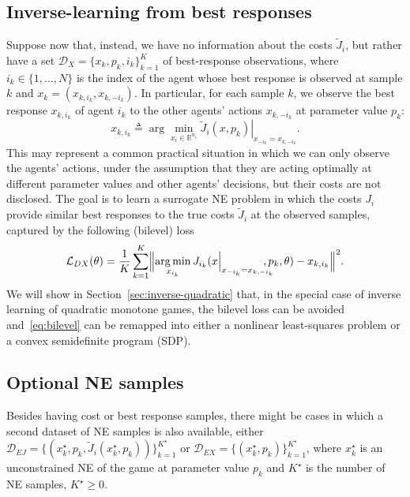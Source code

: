 \documentclass[11pt, a4paper]{article}
\newcommand{\rr}{\mathbb{R}}
\newcommand{\DD}{\mathcal{D}}
\newcommand{\LL}{\mathcal{L}}
\theoremstyle{remark}
\theoremstyle{plain}
\begin{document}
\subsection{Inverse-learning from best responses}
Suppose now that, instead, we have no information about the costs $\tilde J_i$, but rather have a set 
$\DD_X=\{x_k,p_k,i_k\}_{k=1}^{K}$ of best-response observations, where $i_k\in\{1,\ldots,N\}$ is the index of the agent whose best response is observed at sample $k$ and $x_k = (x_{k,i_k}, x_{k,-i_k})$. In particular,
for each sample $k$, we observe the best response $x_{k,i_k}$ of agent $i_k$ to the other agents' actions $x_{k,-i_k}$ at parameter value $p_k$:
\[
    x_{k,i_k} \triangleq \arg\min_{x_i\in\rr^{n_i}} \left. \tilde J_{i}(x,p_k)\right|_{x_{-i_k}=x_{k,-i_k}}.
\]
This may represent a common practical situation in which we can only observe the agents' actions, under the assumption that they are acting optimally at different parameter values and other agents' decisions, but their costs are not disclosed. The goal is to learn a surrogate NE problem in which the costs $J_i$ provide similar best responses to the true costs $\tilde J_i$ at the observed samples, captured by the following (bilevel) loss
\begin{equation}
    \LL_{DX}(\theta) = \frac{1}{K}\sum_{k=1}^{K}
    \Bigl\| \operatorname*{arg\,min}_{x_{i_k}} J_{i_k}(x\Big|_{x_{-i_k}=x_{k,-i_k}}\!\!\!\!\!\!,p_k, \theta)-{x}_{k,i_k} \Bigr\|^2.
    \label{eq:bilevel}
\end{equation}
We will show in Section~\ref{sec:inverse-quadratic} that, in the special case of inverse learning of quadratic monotone games, the bilevel loss can be avoided and~\eqref{eq:bilevel} can be remapped into either a nonlinear least-squares problem or a convex semidefinite program (SDP).

\subsection{Optional NE samples}
Besides having cost or best response samples, there might be cases in which a second dataset of NE samples is also available, either $\DD_{EJ}=\{(x_k^\star,p_k,\tilde J_i(x^\star_k,p_k))\}_{k=1}^{K^\star}$ or $\DD_{EX}=\{(x_k^\star,p_k)\}_{k=1}^{K^\star}$, where $x_k^\star$ is an unconstrained NE of the game at parameter value $p_k$ and $K^\star$ is the number of NE samples, $K^\star\geq 0$.
\end{document}
